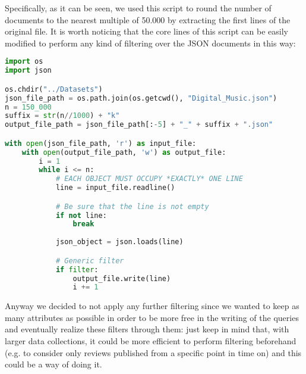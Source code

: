 Specifically, as it can be seen, we used this script to round the number of documents to the nearest multiple of 50.000 by extracting the first lines of the original file.
It is worth noticing that the core lines of this script can be easily modified to perform any kind of filtering over the JSON documents in this way:\\
\begin{lstlisting}[language=Python]
import os
import json

os.chdir("../Datasets")
json_file_path = os.path.join(os.getcwd(), "Digital_Music.json")
n = 150_000
suffix = str(n//1000) + "k"
output_file_path = json_file_path[:-5] + "_" + suffix + ".json"

with open(json_file_path, 'r') as input_file:
    with open(output_file_path, 'w') as output_file:
        i = 1
        while i <= n:
            # EACH OBJECT MUST OCCUPY *EXACTLY* ONE LINE
            line = input_file.readline()

            # Be sure that the line is not empty
            if not line:
                break
                
            json_object = json.loads(line)

            # Generic filter
            if filter:
                output_file.write(line)
                i += 1
\end{lstlisting}
Anyway we decided to not apply any further filtering since we wanted to keep as many attributes as possible in order to be more free in the writing of the queries and eventually realize these filters through them: just keep in mind that, with larger data collections, it could be more efficient to perform filtering beforehand (e.g. to consider only reviews published from a specific point in time on) and this could be a way of doing it.